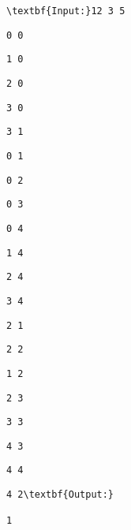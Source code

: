 \begin{verbatim}
\textbf{Input:}12 3 5 \end{verbatim}
\begin{verbatim}
0 0 \end{verbatim}
\begin{verbatim}
1 0 \end{verbatim}
\begin{verbatim}
2 0 \end{verbatim}
\begin{verbatim}
3 0 \end{verbatim}
\begin{verbatim}
3 1 \end{verbatim}
\begin{verbatim}
0 1 \end{verbatim}
\begin{verbatim}
0 2 \end{verbatim}
\begin{verbatim}
0 3 \end{verbatim}
\begin{verbatim}
0 4 \end{verbatim}
\begin{verbatim}
1 4 \end{verbatim}
\begin{verbatim}
2 4 \end{verbatim}
\begin{verbatim}
3 4 \end{verbatim}
\begin{verbatim}
2 1 \end{verbatim}
\begin{verbatim}
2 2 \end{verbatim}
\begin{verbatim}
1 2 \end{verbatim}
\begin{verbatim}
2 3 \end{verbatim}
\begin{verbatim}
3 3 \end{verbatim}
\begin{verbatim}
4 3 \end{verbatim}
\begin{verbatim}
4 4 \end{verbatim}
\begin{verbatim}
4 2\textbf{Output:}

1

\end{verbatim}